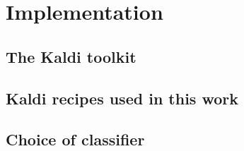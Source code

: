 \documentclass[bsc,frontabs,twoside,singlespacing,parskip,deptreport]{infthesis}
\begin{document}
\chapter{Implementation}{
  \label{chap:Implementation}

  \section{The Kaldi toolkit}{
    \label{sec:kaldi}
  }

  \section{Kaldi recipes used in this work}{
    \label{sec:recipes}
  }

  \section{Choice of classifier}{
    \label{sec:classifier}
    
}}
\end{document}
